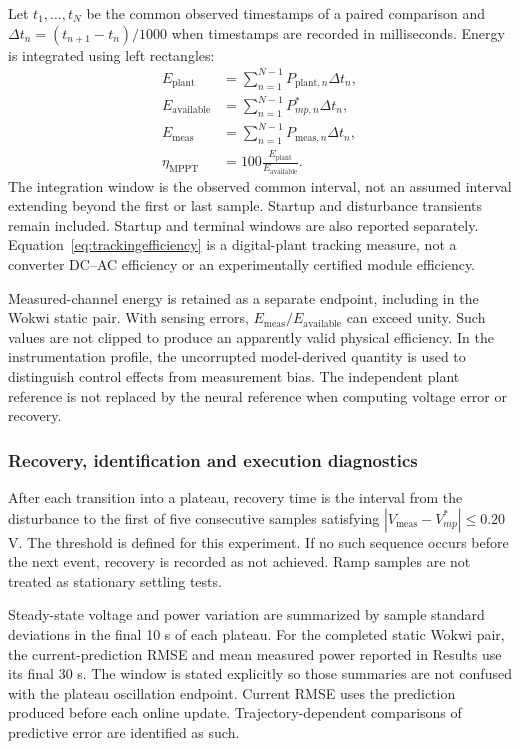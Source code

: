 \documentclass[Acad.Energy.,researcharticle,9pt,twoside,oneauthor]{Definitions/jams_academia}
\begin{document}
Let $t_1,\ldots,t_N$ be the common observed timestamps of a paired comparison and $\Delta t_n=(t_{n+1}-t_n)/1000$ when timestamps are recorded in milliseconds. Energy is integrated using left rectangles:
\begin{align}
 E_{\mathrm{plant}}&=\sum_{n=1}^{N-1}P_{\mathrm{plant},n}\Delta t_n,\\
 E_{\mathrm{available}}&=\sum_{n=1}^{N-1}P_{mp,n}^{*}\Delta t_n,\\
 E_{\mathrm{meas}}&=\sum_{n=1}^{N-1}P_{\mathrm{meas},n}\Delta t_n,\\
 \eta_{\mathrm{MPPT}}&=100\frac{E_{\mathrm{plant}}}{E_{\mathrm{available}}}.
 \label{eq:trackingefficiency}
\end{align}
The integration window is the observed common interval, not an assumed interval extending beyond the first or last sample. Startup and disturbance transients remain included. Startup and terminal windows are also reported separately. Equation~\ref{eq:trackingefficiency} is a digital-plant tracking measure, not a converter DC--AC efficiency or an experimentally certified module efficiency.

Measured-channel energy is retained as a separate endpoint, including in the Wokwi static pair. With sensing errors, $E_{\mathrm{meas}}/E_{\mathrm{available}}$ can exceed unity. Such values are not clipped to produce an apparently valid physical efficiency. In the instrumentation profile, the uncorrupted model-derived quantity is used to distinguish control effects from measurement bias. The independent plant reference is not replaced by the neural reference when computing voltage error or recovery.

\subsubsection{Recovery, identification and execution diagnostics}
After each transition into a plateau, recovery time is the interval from the disturbance to the first of five consecutive samples satisfying $|V_{\mathrm{meas}}-V_{mp}^{*}|\leq0.20$ V. The threshold is defined for this experiment. If no such sequence occurs before the next event, recovery is recorded as not achieved. Ramp samples are not treated as stationary settling tests.

Steady-state voltage and power variation are summarized by sample standard deviations in the final 10 s of each plateau. For the completed static Wokwi pair, the current-prediction RMSE and mean measured power reported in Results use its final 30 s. The window is stated explicitly so those summaries are not confused with the plateau oscillation endpoint. Current RMSE uses the prediction produced before each online update. Trajectory-dependent comparisons of predictive error are identified as such.
\end{document}
